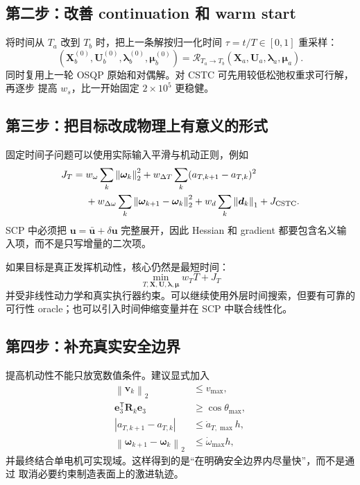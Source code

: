 \documentclass[UTF8,a4paper,11pt]{ctexart}
\newcommand{\normtwo}[1]{\left\lVert#1\right\rVert_2}
\newcommand{\normone}[1]{\left\lVert#1\right\rVert_1}
\begin{document}
\subsection{第二步：改善 continuation 和 warm start}

将时间从 $T_a$ 改到 $T_b$ 时，把上一条解按归一化时间
$\tau=t/T\in[0,1]$ 重采样：
\begin{equation}
 (\bm X_b^{(0)},\bm U_b^{(0)},\bm\lambda_b^{(0)},\bm\mu_b^{(0)})
 =\mathcal R_{T_a\rightarrow T_b}(\bm X_a,\bm U_a,\bm\lambda_a,\bm\mu_a).
\end{equation}
同时复用上一轮 OSQP 原始和对偶解。对 CSTC 可先用较低松弛权重求可行解，再逐步
提高 $w_s$，比一开始固定 $2\times10^5$ 更稳健。

\subsection{第三步：把目标改成物理上有意义的形式}

固定时间子问题可以使用实际输入平滑与机动正则，例如
\begin{align}
 J_T={}&w_\omega\sum_k\normtwo{\bm\omega_k}^2
 +w_{\Delta T}\sum_k(a_{T,k+1}-a_{T,k})^2\nonumber\\
 &+w_{\Delta\omega}\sum_k
 \normtwo{\bm\omega_{k+1}-\bm\omega_k}^2
 +w_d\sum_k\normone{\bm d_k}+J_{\rm CSTC}.
\end{align}
SCP 中必须把 $\bm u=\bar{\bm u}+\delta\bm u$ 完整展开，因此 Hessian 和 gradient
都要包含名义输入项，而不是只写增量的二次项。

如果目标是真正发挥机动性，核心仍然是最短时间：
\begin{equation}
 \min_{T,\bm X,\bm U,\bm\lambda,\bm\mu}
 w_TT+J_T
\end{equation}
并受非线性动力学和真实执行器约束。可以继续使用外层时间搜索，但要有可靠的可行性
oracle；也可以引入时间伸缩变量并在 SCP 中联合线性化。

\subsection{第四步：补充真实安全边界}

提高机动性不能只放宽数值条件。建议显式加入
\begin{align}
 \normtwo{\bm v_k}&\leq v_{\max},\\
 \bm e_3^\mathsf T\bm R_k\bm e_3&\geq\cos\theta_{\max},\\
 |a_{T,k+1}-a_{T,k}|&\leq\dot a_{T,\max}h,\\
 \normtwo{\bm\omega_{k+1}-\bm\omega_k}&\leq\dot\omega_{\max}h,
\end{align}
并最终结合单电机可实现域。这样得到的是“在明确安全边界内尽量快”，而不是通过
取消必要约束制造表面上的激进轨迹。
\end{document}
